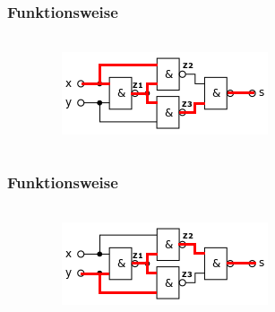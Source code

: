 \begin{frame}
    \frametitle{Funktionsweise}
    \framesubtitle{}
    \begin{columns}[c]
            \begin{center}
            \end{center}
            \begin{figure}[H]
            \begin{center}
                    \includegraphics[scale=0.7]{./img/schaltung/xornand_fun_10.png}
            \end{center}
            \end{figure}
    \end{columns}
\end{frame}

\begin{frame}
    \frametitle{Funktionsweise}
    \framesubtitle{}
    \begin{columns}[c]
            \begin{center}
            \end{center}
            \begin{figure}[H]
            \begin{center}
                    \includegraphics[scale=0.7]{./img/schaltung/xornand_fun_01.png}
            \end{center}
            \end{figure}
    \end{columns}
\end{frame}

